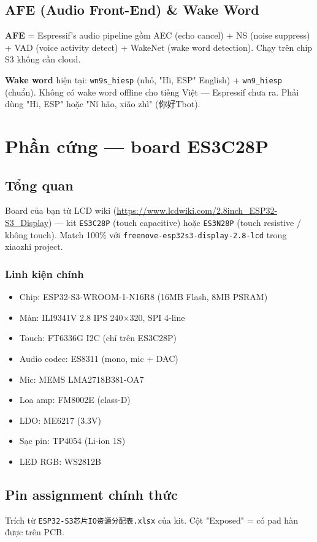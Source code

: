 \documentclass[11pt,a4paper]{article}
\begin{document}
\subsection{AFE (Audio Front-End) \& Wake Word}
\textbf{AFE} = Espressif's audio pipeline gồm AEC (echo cancel) + NS (noise suppress) + VAD (voice activity detect) + WakeNet (wake word detection). Chạy trên chip S3 không cần cloud.

\textbf{Wake word} hiện tại: \texttt{wn9s\_hiesp} (nhỏ, "Hi, ESP" English) + \texttt{wn9\_hiesp} (chuẩn). Không có wake word offline cho tiếng Việt — Espressif chưa ra. Phải dùng "Hi, ESP" hoặc "Nǐ hǎo, xiǎo zhì" (你好Tbot).

\section{Phần cứng — board ES3C28P}\label{sec:gpio}
\subsection{Tổng quan}
Board của bạn từ LCD wiki (\url{https://www.lcdwiki.com/2.8inch_ESP32-S3_Display}) — kit \texttt{ES3C28P} (touch capacitive) hoặc \texttt{ES3N28P} (touch resistive / không touch). Match 100\% với \texttt{freenove-esp32s3-display-2.8-lcd} trong xiaozhi project.

\subsubsection*{Linh kiện chính}
\begin{itemize}
  \item Chip: ESP32-S3-WROOM-1-N16R8 (16MB Flash, 8MB PSRAM)
  \item Màn: ILI9341V 2.8\textquotesingle{} IPS 240×320, SPI 4-line
  \item Touch: FT6336G I2C (chỉ trên ES3C28P)
  \item Audio codec: ES8311 (mono, mic + DAC)
  \item Mic: MEMS LMA2718B381-OA7
  \item Loa amp: FM8002E (class-D)
  \item LDO: ME6217 (3.3V)
  \item Sạc pin: TP4054 (Li-ion 1S)
  \item LED RGB: WS2812B
\end{itemize}

\subsection{Pin assignment chính thức}
Trích từ \texttt{ESP32-S3芯片IO资源分配表.xlsx} của kit. Cột "Exposed" = có pad hàn được trên PCB.
\end{document}
